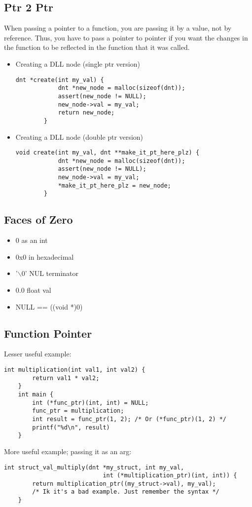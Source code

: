 \documentclass{article}
\begin{document}
\subsection{Ptr 2 Ptr}
When passing a pointer to a function, you are passing it by a value, not by reference. Thus, you have to pass a pointer to pointer if you want the changes in the function to be reflected in the function that it was called.
\begin{itemize}
    \item Creating a DLL node (single ptr version)
    \begin{lstlisting}[style=CStyle]
        dnt *create(int my_val) {
            dnt *new_node = malloc(sizeof(dnt));
            assert(new_node != NULL);
            new_node->val = my_val;
            return new_node;
        }
    \end{lstlisting}
    \item Creating a DLL node (double ptr version)
    \begin{lstlisting}[style=CStyle]
        void create(int my_val, dnt **make_it_pt_here_plz) {
            dnt *new_node = malloc(sizeof(dnt));
            assert(new_node != NULL);
            new_node->val = my_val;
            *make_it_pt_here_plz = new_node;
        }
    \end{lstlisting}
\end{itemize}

\subsection{Faces of Zero}
\begin{itemize}
    \item 0 as an int
    \item 0x0 in hexadecimal
    \item '$\backslash$0' NUL terminator
    \item 0.0 float val
    \item NULL == ((void *)0)
\end{itemize}

\subsection{Function Pointer}
Lesser useful example:
\begin{lstlisting}[style=CStyle]
    int multiplication(int val1, int val2) {
        return val1 * val2;
    }
    int main {
        int (*func_ptr)(int, int) = NULL;
        func_ptr = multiplication;
        int result = func_ptr(1, 2); /* Or (*func_ptr)(1, 2) */
        printf("%d\n", result)
    }
\end{lstlisting}
More useful example; passing it as an arg:
\begin{lstlisting}[style=CStyle]
    int struct_val_multiply(dnt *my_struct, int my_val, 
                            int (*multiplication_ptr)(int, int)) {
        return multiplication_ptr((my_struct->val), my_val);
        /* Ik it's a bad example. Just remember the syntax */
    }
\end{lstlisting}
\end{document}
